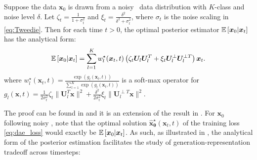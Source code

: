 \begin{prop}\label{lem:E[x_0]_multi}
Suppose the data $\bm x_0$ is drawn from a noisy \MoLRG~data distribution with $K$-class and noise level $\delta$. Let  $\zeta_t = \frac{1}{1 + \sigma_t^2}$ and $\xi_t = \frac{\delta^2}{\delta^2 + \sigma_t^2}$, where $\sigma_t$ is the noise scaling in \eqref{eq:Tweedie}. Then for each time $t > 0$, the optimal posterior estimator $\operatorname{\mathbb{E}}\left[\bm x_0 \vert \bm x_t\right]$ has the analytical form: 
\begin{align*}
    \operatorname{\mathbb{E}}\left[ \bm x_0 \vert \bm x_t\right] = \sum_{l=1}^K w^{\star}_l(\bm x_t,t) \left( \zeta_t \bm U_l\bm U_l^T + \xi_t \bm U_l^{\perp}\bm U_l^{\perp T} \right) \bm x_t.
\end{align*}
where $w^{\star}_l(\bm x_t,t) = \frac{\exp\left(g_l(\bm x_t, t) \right)}{\sum_{l=1}^K \exp\left(g_l(\bm x_t, t) \right)}$ is a soft-max operator for $g_l(\bm x,t) = \frac{1}{2\sigma_t^2}\zeta_t \|\bm U_l^T \bm x\|^2 + \frac{\delta^2}{2 \sigma_t^2}\xi_t \| \bm U_l^{\perp T} \bm x \|^2 $.
\end{prop}
The proof can be found in  and it is an extension of the result in \citep{wang2024diffusion}. For $\bm x_0$ following noisy \MoLRG, note that the optimal solution $\hat{\bm x}_{\bm \theta}^{\star}(\bm x_t, t) $ of the training loss \eqref{eq:dae_loss} would exactly be $ \operatorname{\mathbb{E}}\left[\bm x_0 \vert \bm x_t\right]$. As such, as illustrated in , the analytical form of the posterior estimation facilitates the study of generation-representation tradeoff across timesteps:
